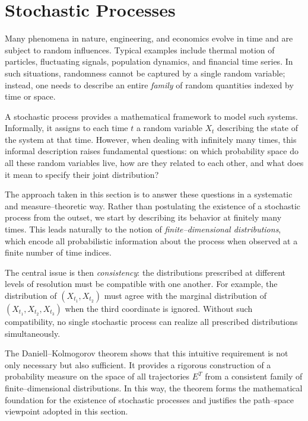 \chapter{Stochastic Processes}

Many phenomena in nature, engineering, and economics evolve in time and are subject to
random influences. Typical examples include thermal motion of particles, fluctuating
signals, population dynamics, and financial time series. In such situations, randomness
cannot be captured by a single random variable; instead, one needs to describe an
entire \emph{family} of random quantities indexed by time or space.

A stochastic process provides a mathematical framework to model such systems. Informally,
it assigns to each time $t$ a random variable $X_t$ describing the state of the system
at that time. However, when dealing with infinitely many times, this informal description
raises fundamental questions: on which probability space do all these random variables
live, how are they related to each other, and what does it mean to specify their joint
distribution?

The approach taken in this section is to answer these questions in a systematic and
measure--theoretic way. Rather than postulating the existence of a stochastic process
from the outset, we start by describing its behavior at finitely many times. This leads
naturally to the notion of \emph{finite--dimensional distributions}, which encode all
probabilistic information about the process when observed at a finite number of time
indices.

The central issue is then \emph{consistency}: the distributions prescribed at different
levels of resolution must be compatible with one another. For example, the distribution
of $(X_{t_1},X_{t_2})$ must agree with the marginal distribution of
$(X_{t_1},X_{t_2},X_{t_3})$ when the third coordinate is ignored. Without such compatibility,
no single stochastic process can realize all prescribed distributions simultaneously.

The Daniell--Kolmogorov theorem shows that this intuitive requirement is not only necessary
but also sufficient. It provides a rigorous construction of a probability measure on the
space of all trajectories $E^T$ from a consistent family of finite--dimensional
distributions. In this way, the theorem forms the mathematical foundation for the
existence of stochastic processes and justifies the path--space viewpoint adopted in
this section.

